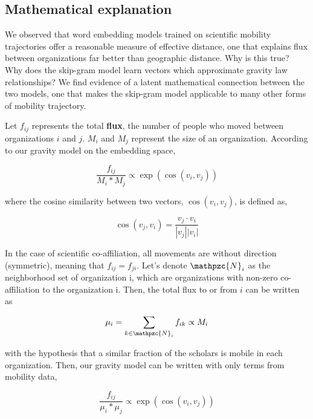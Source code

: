 \documentclass[12pt]{article} %
\begin{document}
%
%
\subsection*{Mathematical explanation}

We observed that word embedding models trained on scientific mobility trajectories offer a reasonable measure of effective distance, one that explains flux between organizations far better than geographic distance.
Why is this true?
Why does the skip-gram model learn vectors which approximate gravity law relationships?
We find evidence of a latent mathematical connection between the two models, one that makes the skip-gram model applicable to many other forms of mobility trajectory.

Let $f_{ij}$ represents the total \textbf{flux}, the number of people who moved between organizations $i$ and $j$. $M_{i}$ and $M_{j}$ represent the size of an organization. According to our gravity model on the embedding space,

\begin{equation}
    \label{eq:gravity_model}
    \frac{f_{ij}}{M_{i} * M_{j}} \propto \exp(\cos(v_i,v_j))
\end{equation}

where the cosine similarity between two vectors, $\cos(v_{i}, v_{j})$, is defined as,

\begin{equation}
    \cos(v_j, v_i) = \frac{v_j \cdot v_i}{|v_j||v_i|}
\end{equation}

In the case of scientific co-affiliation, all movements are without direction (symmetric), meaning that  $f_{ij} = f_{ji}$.
Let's denote $\mathpzc{N}_i$ as the neighborhood set of organization i, which are organizations with non-zero co-affiliation to the organization i.
Then, the total flux to or from $i$ can be written as

\begin{equation}
    \mu_{i} = \sum_{k\in\mathpzc{N}_i} f_{ik} \propto M_i
\end{equation}

with the hypothesis that a similar fraction of the scholars is mobile in each organization. Then, our gravity model can be written with only terms from mobility data,

\begin{equation}
    \label{eq:gravity_model_approx}
    \frac{f_{ij}}{\mu_i * \mu_j} \propto \exp(\cos(v_i,v_j))
\end{equation}
\end{document}
